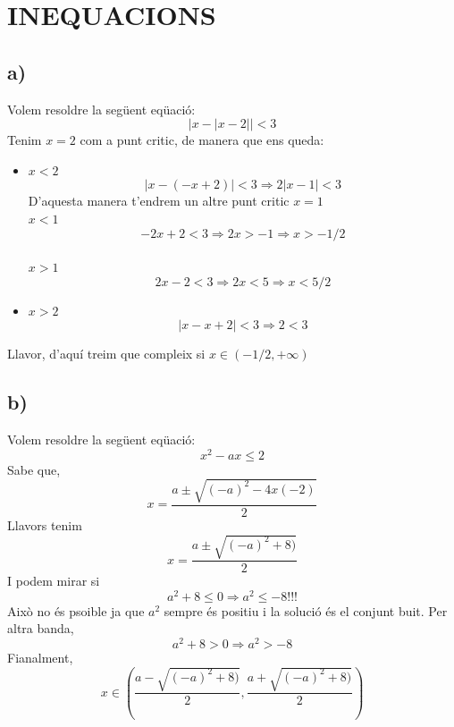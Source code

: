 \section{INEQUACIONS}
\subsection*{a)}
Volem resoldre la següent eqüació:
\begin{equation*}
|x-|x-2||<3
\end{equation*}
Tenim $x=2$ com a punt critic, de manera que ens queda:
\begin{itemize}
\item $x<2$
\begin{equation*}
|x-(-x+2)|<3 \Rightarrow 2|x-1|<3 
\end{equation*}
D'aquesta manera t'endrem un altre punt critic $x=1$\\

$x<1$
\begin{equation*}
-2x+2<3\Rightarrow 2x>-1\Rightarrow x>-1/2
\end{equation*}\\
$x>1$
\begin{equation*}
2x-2<3 \Rightarrow2 x<5 \Rightarrow x<5/2
\end{equation*}
\item $x>2$
\begin{equation*}
|x-x+2|<3 \Rightarrow 2<3
\end{equation*}
\end{itemize}
Llavor, d'aquí treim que compleix si $x \in (-1/2,+\infty)$
\subsection*{b)}
Volem resoldre la següent eqüació:
\begin{equation*}
x^2 - ax \leq 2
\end{equation*}
Sabe que,
\begin{equation*}
x = \frac{a \pm \sqrt{(-a)^2 - 4x(-2)}}{2}
\end{equation*}
Llavors tenim 
\begin{equation*}
x = \frac{a \pm \sqrt{(-a)^2 + 8)}}{2}
\end{equation*}
I podem mirar si 
\begin{equation*}
a^2 + 8 \leq 0 \Rightarrow a^2 \leq -8!!!
\end{equation*}
Això no és psoible ja que $a^2$ sempre és positiu i la solució és el conjunt buit.
Per altra banda, 
\begin{equation*}
a^2 + 8 > 0 \Rightarrow a^2 > -8
\end{equation*}
Fianalment, 
\begin{equation*}
x \in (\frac{a - \sqrt{(-a)^2 + 8)}}{2}, \frac{a + \sqrt{(-a)^2 + 8)}}{2})
\end{equation*}
